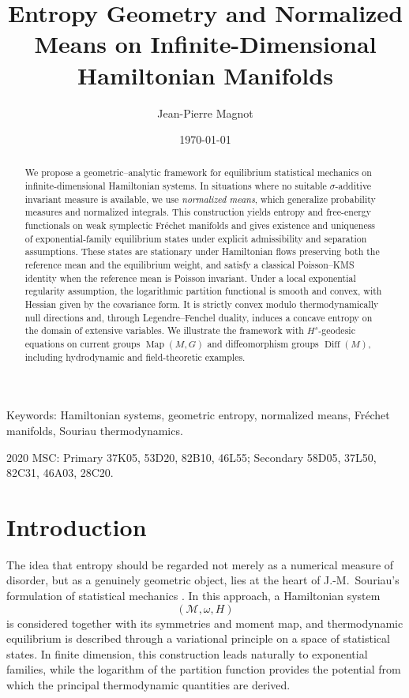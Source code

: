 \documentclass[11pt,reqno]{amsart}
\title[Entropy Geometry and Normalized Means on Infinite-Dimensional Hamiltonian Manifolds]
{Entropy Geometry and Normalized Means on Infinite-Dimensional Hamiltonian Manifolds}
\author[Jean-Pierre Magnot]{Jean-Pierre Magnot}
\date{\today}
\begin{document}
\maketitle

\begin{abstract}
We propose a geometric--analytic framework for equilibrium statistical
mechanics on infinite-dimensional Hamiltonian systems. In situations
where no suitable $\sigma$-additive invariant measure is available, we
use \emph{normalized means}, which generalize probability measures and
normalized integrals. This construction yields entropy and free-energy
functionals on weak symplectic Fréchet manifolds and gives existence and
uniqueness of exponential-family equilibrium states under explicit
admissibility and separation assumptions. These states are stationary
under Hamiltonian flows preserving both the reference mean and the
equilibrium weight, and satisfy a classical Poisson--KMS identity when
the reference mean is Poisson invariant. Under a local exponential
regularity assumption, the logarithmic partition functional is smooth
and convex, with Hessian given by the covariance form. It is strictly
convex modulo thermodynamically null directions and, through
Legendre--Fenchel duality, induces a concave entropy on the domain of
extensive variables. We illustrate the framework with $H^s$-geodesic
equations on current groups $\operatorname{Map}(M,G)$ and
diffeomorphism groups $\operatorname{Diff}(M)$, including hydrodynamic
and field-theoretic examples.
\end{abstract}

\vskip 12pt
Keywords: Hamiltonian systems, geometric entropy, normalized means,
Fréchet manifolds, Souriau thermodynamics.

\vskip 12pt
2020 MSC: Primary 37K05, 53D20, 82B10, 46L55;
Secondary 58D05, 37L50, 82C31, 46A03, 28C20.


\section*{Introduction}

The idea that entropy should be regarded not merely as a numerical
measure of disorder, but as a genuinely geometric object, lies at the
heart of J.-M.~Souriau's formulation of statistical mechanics
\cite{Souriau70}. In this approach, a Hamiltonian system
\[
(\mathcal M,\omega,H)
\]
is considered together with its symmetries and moment map, and
thermodynamic equilibrium is described through a variational principle
on a space of statistical states. In finite dimension, this construction
leads naturally to exponential families, while the logarithm of the
partition function provides the potential from which the principal
thermodynamic quantities are derived.
\end{document}
